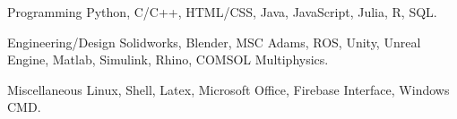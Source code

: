 

\begin{cvskills}

  \cvskill
    {Programming} %
    {Python, C/C++, HTML/CSS, Java, JavaScript, Julia, R, SQL.} %

\cvskill
{Engineering/Design} %
{Solidworks, Blender, MSC Adams, ROS, Unity, Unreal Engine, Matlab, Simulink, Rhino, COMSOL Multiphysics.} %

  \cvskill
    {Miscellaneous} %
    {Linux, Shell, Latex, Microsoft Office, Firebase Interface, Windows CMD.} %
   


\end{cvskills}
